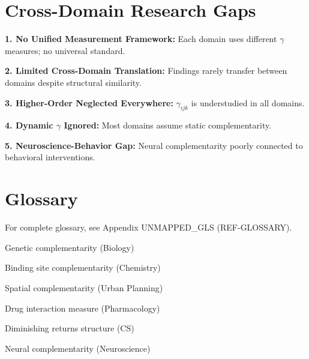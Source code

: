 \section{Cross-Domain Research Gaps}
\label{sec:gaps}

\begin{tcolorbox}[colback=red!5!white,colframe=red!75!black,title=\textbf{Identified Research Gaps}]

\textbf{1. No Unified Measurement Framework:}
Each domain uses different $\gamma$ measures; no universal standard.

\textbf{2. Limited Cross-Domain Translation:}
Findings rarely transfer between domains despite structural similarity.

\textbf{3. Higher-Order Neglected Everywhere:}
$\gamma_{ijk}$ is understudied in all domains.

\textbf{4. Dynamic $\gamma$ Ignored:}
Most domains assume static complementarity.

\textbf{5. Neuroscience-Behavior Gap:}
Neural complementarity poorly connected to behavioral interventions.

\end{tcolorbox}

\section{Glossary}
\label{sec:glossary-catalog}

For complete glossary, see Appendix UNMAPPED_GLS (REF-GLOSSARY).

\begin{description}[noitemsep]
    \item[Epistasis] Genetic complementarity (Biology)
    \item[Cooperativity] Binding site complementarity (Chemistry)
    \item[Agglomeration] Spatial complementarity (Urban Planning)
    \item[Combination Index] Drug interaction measure (Pharmacology)
    \item[Submodularity] Diminishing returns structure (CS)
    \item[Integration] Neural complementarity (Neuroscience)
\end{description}

